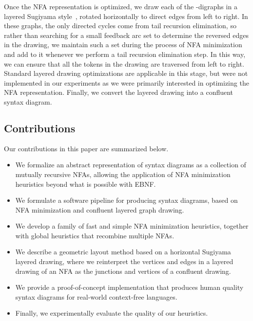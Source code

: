 \documentclass[10pt]{llncs}
\begin{document}
Once the NFA representation is optimized, we draw each of the -digraphs in a layered Sugiyama style~\cite{SugTagSho-SMC-1981,BasMat-DGMM-01}, rotated horizontally to direct edges from left to right. In these graphs, the only directed cycles come from tail recursion elimination, so rather than searching for a small feedback arc set to determine the reversed edges in the drawing, we maintain such a set during the process of NFA minimization and add to it whenever we perform a tail recursion elimination step. In this way, we can ensure that all the tokens in the drawing are traversed from left to right. Standard layered drawing optimizations are applicable in this stage, but were not implemented in our experiments as we were primarily interested in optimizing the NFA representation. Finally, we convert the layered drawing into a confluent syntax diagram.

\subsection{Contributions}
Our contributions in this paper are summarized below.
\begin{itemize}
\item We formalize an abstract representation of syntax diagrams as a collection of mutually recursive NFAs, allowing the application of NFA minimization heuristics beyond what is possible with EBNF.
\item We formulate a software pipeline for producing syntax diagrams, based on NFA minimization and confluent layered graph drawing.
\item We develop a family of fast and simple NFA minimization heuristics, together with global heuristics that recombine multiple NFAs.
\item We describe a geometric layout method based on a horizontal Sugiyama layered drawing, where we reinterpret the vertices and edges in a layered drawing of an NFA as the junctions and vertices of a confluent drawing.
\item We provide a proof-of-concept implementation that produces human quality syntax diagrams for real-world context-free languages.
\item Finally, we experimentally evaluate the quality of our heuristics.
\end{itemize}
\end{document}

